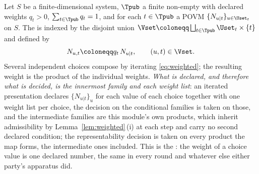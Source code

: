 \begin{definition}\label{def:weighted}
Let $S$ be a finite-dimensional system, $\Tpub$ a finite non-empty
with declared weights $q_t>0$, $\sum_{t\in\Tpub}q_t=1$, and for each
$t\in\Tpub$ a POVM $\{N_{u|t}\}_{u\in\Uset_t}$ on $S$. The
is indexed by the disjoint union
$\Vset\coloneqq\bigsqcup_{t\in\Tpub}\Uset_t\times\{t\}$ and defined by
\begin{equation}\label{eq:weighted}
  N_{u,t}\coloneqq q_t\,N_{u|t},\qquad (u,t)\in\Vset .
\end{equation}
Several independent choices compose by iterating \eqref{eq:weighted}; the
resulting weight is the product of the individual weights. \emph{What is
declared, and therefore what is decided, is the innermost family and each
weight list}: an iterated presentation declares $\{N_{u|t}\}_u$ for each value
of each choice together with one weight list per choice, the decision on the
conditional families is taken on those, and the intermediate
families are this module's own products, which inherit admissibility by
Lemma~\ref{lem:weighted}\,(i) at each step and carry no second declared
condition; the representability decision is taken on every product the map
forms, the intermediate ones included. This is the
:
the weight of a choice value is one declared number, the same in every round
and whatever else either party's apparatus did.


\end{definition}
